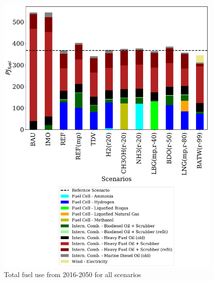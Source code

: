 \documentclass[article]{elsarticle}
\begin{document}
\begin{figure}[htb]
    \centering
    \includegraphics[width=\textwidth]{figures/AllFuelTotal.pdf}
    \caption{Total fuel use from 2016-2050 for all scenarios}
    \label{fig:AllFuelTotal}
\end{figure}
\end{document}
